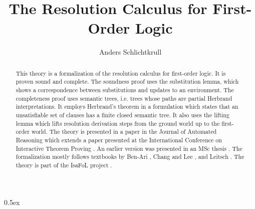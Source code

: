 \documentclass[11pt,a4paper]{article}
\begin{document}
\title{The Resolution Calculus for First-Order Logic}
\author{Anders Schlichtkrull}
\maketitle
\begin{abstract}
This theory is a formalization of the resolution calculus for first-order logic. It is proven sound and complete.
The soundness proof uses the substitution lemma, which shows a correspondence between substitutions and updates to
an environment. The completeness proof uses semantic trees, i.e. trees whose paths are partial Herbrand interpretations.
It employs Herbrand's theorem in a formulation which states that an unsatisfiable set of clauses has a finite closed
semantic tree. It also uses the lifting lemma which lifts resolution derivation steps from the ground world up to the
first-order world. The theory is presented in a paper in the Journal of Automated Reasoning \cite{schlichtkrull2018}
which extends a paper presented at the International Conference on Interactive Theorem Proving \cite{schlichtkrull2016}.
An earlier version was presented in an MSc thesis \cite{thesis}. The formalization mostly follows textbooks by Ben-Ari
\cite{ben-ari}, Chang and Lee \cite{chang}, and Leitsch \cite{leitsch}. The theory is part of the IsaFoL project
\cite{isafol}.
\end{abstract}

\tableofcontents

\parindent 0pt\parskip 0.5ex





\end{document}
